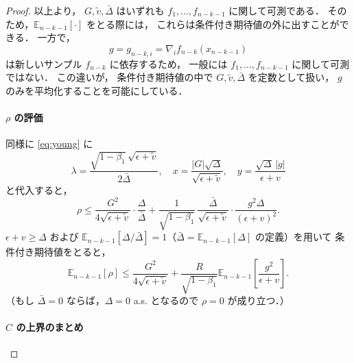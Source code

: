 \documentclass[dvipdfmx,a4paper,11pt]{jsarticle}
\begin{document}
\begin{proof}
以上より，
$G,\tilde{v},\bar{\Delta}$ はいずれも
$f_1,\dots,f_{n-k-1}$ に関して可測である．
そのため，$\mathbb{E}_{n-k-1}[\cdot]$ をとる際には，
これらは条件付き期待値の外に出すことができる．
一方で，
\[
  g = g_{n-k,i} = \nabla_i f_{n-k}(x_{n-k-1})
\]
は新しいサンプル $f_{n-k}$ に依存するため，
一般には $f_1,\dots,f_{n-k-1}$ に関して可測ではない．
この違いが，
条件付き期待値の中で $G,\tilde{v},\bar{\Delta}$ を定数として扱い，
$g$ のみを平均化することを可能にしている．


\paragraph{$\rho$ の評価}

同様に \eqref{eq:young} に
\begin{equation}
    \lambda = \frac{\sqrt{1-\beta_1}\,\sqrt{\epsilon+\tilde{v}}}{2\bar{\Delta}},\quad
    x = \frac{|G|\sqrt{\Delta}}{\sqrt{\epsilon+\tilde{v}}},\quad
    y = \frac{\sqrt{\Delta}\,|g|}{\epsilon+v}
\end{equation}
と代入すると，
\begin{equation}
    \rho \leq \frac{G^2}{4\sqrt{\epsilon+\tilde{v}}} \cdot \frac{\Delta}{\bar{\Delta}}
    + \frac{1}{\sqrt{1-\beta_1}}\,
      \frac{\bar{\Delta}}{\sqrt{\epsilon+\tilde{v}}}
      \cdot \frac{g^2\Delta}{(\epsilon+v)^2}.
    \tag{A.23}
    \label{eq:rho_bound_Delta}
\end{equation}
$\epsilon + v \geq \Delta$ および
\(\mathbb{E}_{n-k-1}[\Delta/\bar{\Delta}] = 1\)（\(\bar{\Delta} = \mathbb{E}_{n-k-1}[\Delta]\) の定義）を用いて
条件付き期待値をとると，
\begin{equation}
    \mathbb{E}_{n-k-1}[\rho]
    \leq \frac{G^2}{4\sqrt{\epsilon+\tilde{v}}}
    + \frac{R}{\sqrt{1-\beta_1}}
      \mathbb{E}_{n-k-1}\!\left[\frac{g^2}{\epsilon+v}\right].
    \tag{A.24}
    \label{eq:rho_simplified_Delta}
\end{equation}
（もし $\bar{\Delta} = 0$ ならば，$\Delta = 0$ a.s. となるので $\rho = 0$ が成り立つ．）

\paragraph{$C$ の上界のまとめ}


\end{proof}
\end{document}
